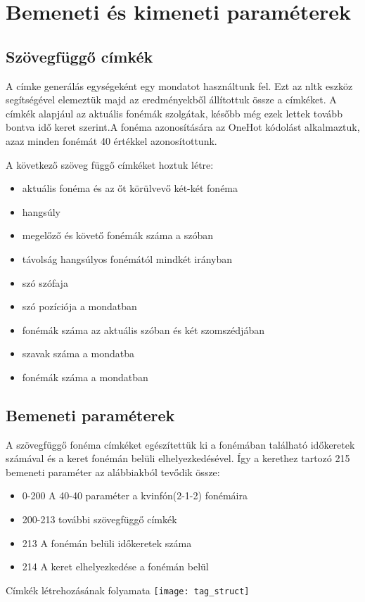 \section{Bemeneti és kimeneti paraméterek}
\subsection{Szövegfüggő címkék}
A címke generálás egységeként egy mondatot használtunk fel. Ezt az nltk eszköz segítségével elemeztük majd az eredményekből állítottuk össze a címkéket. A címkék alapjául az aktuális fonémák szolgátak, később még ezek lettek tovább bontva idő keret szerint.A fonéma azonosítására az OneHot kódolást alkalmaztuk, azaz minden fonémát 40 értékkel azonosítottunk.

A következő szöveg függő címkéket hoztuk létre:

\begin{itemize}
	\item aktuális fonéma és az őt körülvevő két-két fonéma
	\item hangsúly
	\item megelőző és követő fonémák száma a szóban 
	\item távolság hangsúlyos fonémától mindkét irányban
	\item szó szófaja
	\item szó pozíciója a mondatban
	\item fonémák száma az aktuális szóban és két szomszédjában
	\item szavak száma a mondatba
	\item fonémák száma a mondatban
\end{itemize}

\subsection{Bemeneti paraméterek}
A szövegfüggő fonéma címkéket egészítettük ki a fonémában található időkeretek számával és a keret fonémán belüli elhelyezkedésével. Így a kerethez tartozó 215 bemeneti paraméter az alábbiakból tevődik össze:


\begin{minipage}{0.5\textwidth}
	\begin{itemize}
		\item 0-200 A 40-40 paraméter a kvinfón(2-1-2) fonémáira
		\item 200-213 további szövegfüggő címkék
		\item 213 A fonémán belüli időkeretek száma
		\item 214 A keret elhelyezkedése a fonémán belül
	\end{itemize} 
\end{minipage} \hfill
\begin{minipage}{0.5\textwidth}
	\centering
	Címkék létrehozásának folyamata
	\texttt{[image: tag\_struct]}
\end{minipage} \hfill
